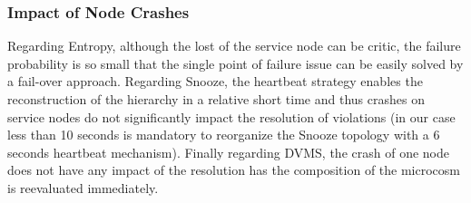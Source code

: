


\subsubsection{Impact of Node Crashes}
\label{subsubsec:node-crashes}
  Regarding
Entropy, although the lost of the service node can be critic, the
failure probability is so small that the single point of failure issue
can be easily solved by a fail-over approach. Regarding Snooze, the
heartbeat strategy enables the reconstruction of the hierarchy in a
relative short time and thus crashes on service nodes do not
significantly impact the resolution of violations (in our case less
than 10 seconds is mandatory to reorganize the Snooze topology with a
6 seconds heartbeat mechanism). Finally regarding DVMS, the crash of
one node does not have any impact of the resolution has the
composition of the microcosm is reevaluated immediately.



